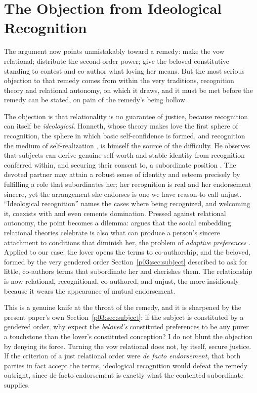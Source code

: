 \documentclass[11pt,a4paper]{article}
\begin{document}
\section{The Objection from Ideological Recognition}\label{p03:sec:ideology}

The argument now points unmistakably toward a remedy: make the vow relational; distribute the second-order power; give the beloved constitutive standing to contest and co-author what loving her means. But the most serious objection to that remedy comes from within the very traditions, recognition theory and relational autonomy, on which it draws, and it must be met before the remedy can be stated, on pain of the remedy's being hollow.

The objection is that relationality is no guarantee of justice, because recognition can itself be \emph{ideological}. Honneth, whose theory makes love the first sphere of recognition, the sphere in which basic self-confidence is formed, and recognition the medium of self-realization \parencite{honneth1995struggle}, is himself the source of the difficulty. He observes that subjects can derive genuine self-worth and stable identity from recognition conferred within, and securing their consent to, a subordinate position \parencite{honneth2007disrespect}. The devoted partner may attain a robust sense of identity and esteem precisely by fulfilling a role that subordinates her; her recognition is real and her endorsement sincere, yet the arrangement she endorses is one we have reason to call unjust. ``Ideological recognition'' names the cases where being recognized, and welcoming it, coexists with and even cements domination. Pressed against relational autonomy, the point becomes a dilemma: \textcite{khader2020feminist} argues that the social embedding relational theories celebrate is also what can produce a person's sincere attachment to conditions that diminish her, the problem of \emph{adaptive preferences} \parencite[cf.][]{khader2011adaptive}. Applied to our case: the lover opens the terms to co-authorship, and the beloved, formed by the very gendered order Section~\ref{p03:sec:subject} described to ask for little, co-authors terms that subordinate her and cherishes them. The relationship is now relational, recognitional, co-authored, and unjust, the more insidiously because it wears the appearance of mutual endorsement.

This is a genuine knife at the throat of the remedy, and it is sharpened by the present paper's own Section~\ref{p03:sec:subject}: if the subject is constituted by a gendered order, why expect the \emph{beloved's} constituted preferences to be any purer a touchstone than the lover's constituted conception? I do not blunt the objection by denying its force. Turning the vow relational does not, by itself, secure justice. If the criterion of a just relational order were \emph{de facto endorsement}, that both parties in fact accept the terms, ideological recognition would defeat the remedy outright, since de facto endorsement is exactly what the contented subordinate supplies.
\end{document}
